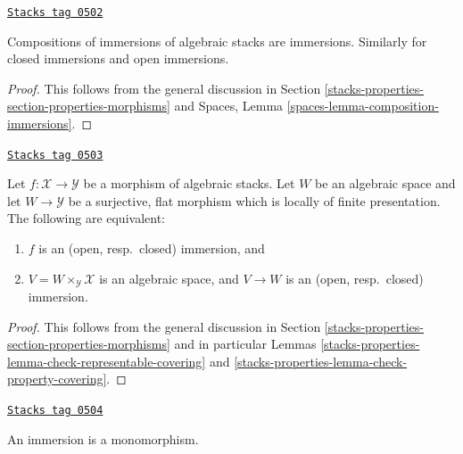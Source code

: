 \begin{lemma}
\label{stacks-properties-lemma-composition-immersion}
\href{https://stacks.math.columbia.edu/tag/0502}{\texttt{Stacks tag 0502}}

Compositions of immersions of algebraic stacks are immersions.
Similarly for closed immersions and open immersions.
\end{lemma}

\begin{proof}
This follows from the general discussion in
Section \ref{stacks-properties-section-properties-morphisms}
and
Spaces, Lemma \ref{spaces-lemma-composition-immersions}.
\end{proof}

\begin{lemma}
\label{stacks-properties-lemma-check-immersion-covering}
\href{https://stacks.math.columbia.edu/tag/0503}{\texttt{Stacks tag 0503}}

Let $f : \mathcal{X} \to \mathcal{Y}$ be a morphism of algebraic stacks.
Let $W$ be an algebraic space and let $W \to \mathcal{Y}$ be a surjective,
flat morphism which is locally of finite presentation. The following
are equivalent:
\begin{enumerate}
\item $f$ is an (open, resp.\ closed) immersion, and
\item $V = W \times_\mathcal{Y} \mathcal{X}$ is an algebraic space, and
$V \to W$ is an (open, resp.\ closed) immersion.
\end{enumerate}
\end{lemma}

\begin{proof}
This follows from the general discussion in
Section \ref{stacks-properties-section-properties-morphisms}
and in particular
Lemmas \ref{stacks-properties-lemma-check-representable-covering} and
\ref{stacks-properties-lemma-check-property-covering}.
\end{proof}

\begin{lemma}
\label{stacks-properties-lemma-immersion-monomorphism}
\href{https://stacks.math.columbia.edu/tag/0504}{\texttt{Stacks tag 0504}}

An immersion is a monomorphism.
\end{lemma}

